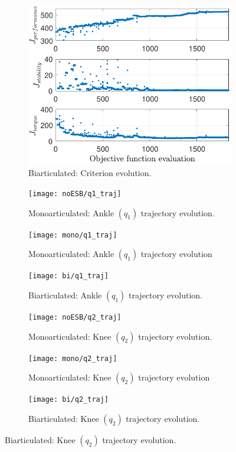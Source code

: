 \documentclass[letterpaper, 10 pt, conference]{ieeeconf}  %
\begin{document}
\begin{figure}[ht]
	\begin{subfigure}[t]{0.32\linewidth}
		\includegraphics[width=\linewidth]{bi/crit_high}
		\caption{Biarticulated: Criterion evolution.}
		\label{fig:bi_crit_high}
	\end{subfigure}
	
	\vspace{1mm}
	
	\begin{subfigure}[t]{0.32\linewidth}
		\texttt{[image: noESB/q1\_traj]}
		\caption{Monoarticulated: Ankle $(q_1)$ trajectory evolution.}
		\label{fig:noESB_q1_traj}
	\end{subfigure}
	\begin{subfigure}[t]{0.32\linewidth}
		\texttt{[image: mono/q1\_traj]}
		\caption{Monoarticulated: Ankle $(q_1)$ trajectory evolution}
		\label{fig:mono_q1_traj}
	\end{subfigure}
	\begin{subfigure}[t]{0.32\linewidth}
		\texttt{[image: bi/q1\_traj]}
		\caption{Biarticulated: Ankle $(q_1)$ trajectory evolution.}
		\label{fig:bi_q1_traj}
	\end{subfigure}
	
	\vspace{1mm}
	
	\begin{subfigure}[t]{0.32\linewidth}
		\texttt{[image: noESB/q2\_traj]}
		\caption{Monoarticulated: Knee $(q_2)$ trajectory evolution.}
		\label{fig:noESB_q2_traj}
	\end{subfigure}
	\begin{subfigure}[t]{0.32\linewidth}
		\texttt{[image: mono/q2\_traj]}
		\caption{Monoarticulated: Knee $(q_2)$ trajectory evolution}
		\label{fig:mono_q2_traj}
	\end{subfigure}
	\begin{subfigure}[t]{0.32\linewidth}
		\texttt{[image: bi/q2\_traj]}
		\caption{Biarticulated: Knee $(q_2)$ trajectory evolution.}
		\label{fig:bi_q2_traj}
	\end{subfigure}
	

\end{figure}
\end{document}
